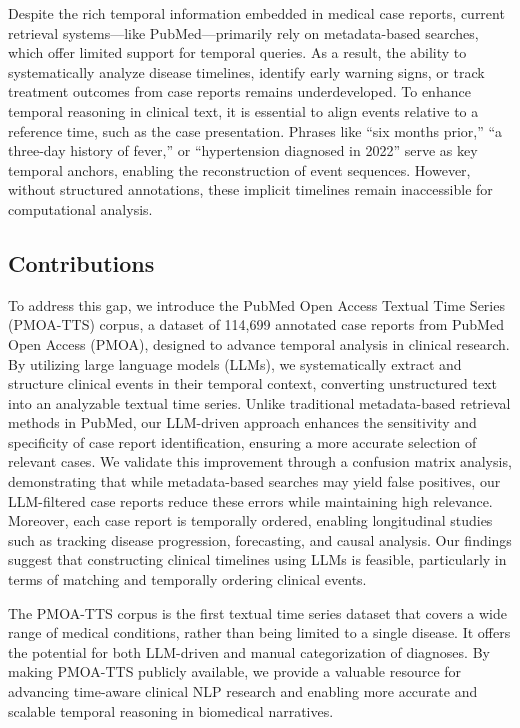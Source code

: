 \documentclass[pmlr]{jmlr}%
\begin{document}
Despite the rich temporal information embedded in medical case reports, current retrieval systems—like PubMed—primarily rely on metadata-based searches, which offer limited support for temporal queries. As a result, the ability to systematically analyze disease timelines, identify early warning signs, or track treatment outcomes from case reports remains underdeveloped. To enhance temporal reasoning in clinical text, it is essential to align events relative to a reference time, such as the case presentation. Phrases like “six months prior,” “a three-day history of fever,” or “hypertension diagnosed in 2022” serve as key temporal anchors, enabling the reconstruction of event sequences. However, without structured annotations, these implicit timelines remain inaccessible for computational analysis.

\subsection{Contributions}

To address this gap, we introduce the PubMed Open Access Textual Time Series (PMOA-TTS) corpus, a dataset of 114,699 annotated case reports from PubMed Open Access (PMOA), designed to advance temporal analysis in clinical research. By utilizing large language models (LLMs), we systematically extract and structure clinical events in their temporal context, converting unstructured text into an analyzable textual time series. Unlike traditional metadata-based retrieval methods in PubMed, our LLM-driven approach enhances the sensitivity and specificity of case report identification, ensuring a more accurate selection of relevant cases. We validate this improvement through a confusion matrix analysis, demonstrating that while metadata-based searches may yield false positives, our LLM-filtered case reports reduce these errors while maintaining high relevance. Moreover, each case report is temporally ordered, enabling longitudinal studies such as tracking disease progression, forecasting, and causal analysis. Our findings suggest that constructing clinical timelines using LLMs is feasible, particularly in terms of matching and temporally ordering clinical events.

The PMOA-TTS corpus is the first textual time series dataset that covers a wide range of medical conditions, rather than being limited to a single disease. It offers the potential for both LLM-driven and manual categorization of diagnoses. By making PMOA-TTS publicly available, we provide a valuable resource for advancing time-aware clinical NLP research and enabling more accurate and scalable temporal reasoning in biomedical narratives.
\end{document}
